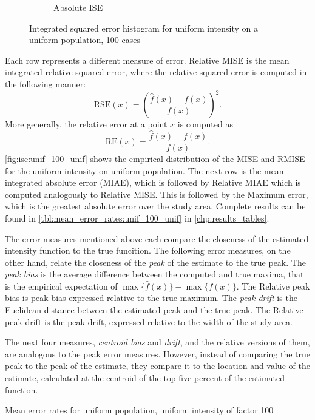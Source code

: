 \begin{figure}[htbp]
\begin{subfigure}[b]{0.45\textwidth}
    \caption{Absolute ISE}
    \end{subfigure}
    \caption[ISE: uniform on uniform]{Integrated squared error histogram for uniform intensity on a uniform population, 100 cases}
    \label{fig:ise:unif_100_unif}
\end{figure}

Each row represents a different measure of error.
Relative MISE is the mean integrated relative squared error, where the relative squared error is computed in the following manner:
\[ \mbox{RSE}(x) = \left(\frac{\hat{f}(x)-f(x)}{f(x)}\right)^2 .\]
More generally, the relative error at a point \(x\) is computed as
\[ \mbox{RE}(x) =  \frac{\hat{f}(x)-f(x)}{f(x)} .\]
\autoref{fig:ise:unif_100_unif} shows the empirical distribution of the MISE and RMISE for the uniform intensity on uniform population.
The next row is the mean integrated absolute error (MIAE), which is followed by Relative MIAE which is computed analogously to Relative MISE.
This is followed by the Maximum error, which is the greatest absolute error over the study area.
Complete results can be found in \autoref{tbl:mean_error_rates:unif_100_unif} in \autoref{chp:results_tables}.

The error measures mentioned above each compare the closeness of the estimated intensity function to the true funcition.
The following error measures, on the other hand, relate the closeness of the \textit{peak} of the estimate to the true peak.
The \textit{peak bias} is the average difference between the computed and true maxima,
that is the empirical expectation of \(\max{\{\hat{f}(x)\}} - \max{\{f(x)\}}\).
The Relative peak bias is peak bias expressed relative to the true maximum.
The \textit{peak drift} is the Euclidean distance between the estimated peak and the true peak.
The Relative peak drift is the peak drift, expressed relative to the width of the study area.

The next four measures, \textit{centroid bias} and \textit{drift}, and the relative versions of them, are analogous to the peak error measures.
However, instead of comparing the true peak to the peak of the estimate, they compare it to the location and value of the estimate, calculated at the centroid of the top five percent of the estimated function.

\begin{table}[htbp]
\centering

\caption{Mean error rates for uniform population, uniform intensity of factor 100}
\label{tbl:errors:unif_100_unif}
\end{table}


